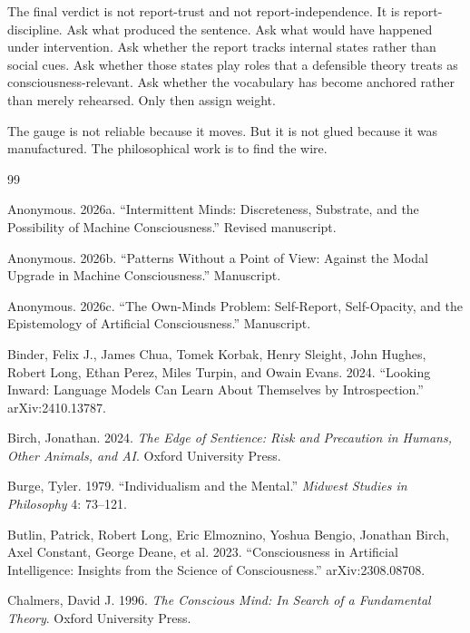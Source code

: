\documentclass[11pt]{article}
\begin{document}
The final verdict is not report-trust and not report-independence. It is report-discipline. Ask what produced the sentence. Ask what would have happened under intervention. Ask whether the report tracks internal states rather than social cues. Ask whether those states play roles that a defensible theory treats as consciousness-relevant. Ask whether the vocabulary has become anchored rather than merely rehearsed. Only then assign weight.

The gauge is not reliable because it moves. But it is not glued because it was manufactured. The philosophical work is to find the wire.

\newpage
\begin{thebibliography}{99}

Anonymous. 2026a. ``Intermittent Minds: Discreteness, Substrate, and the Possibility of Machine Consciousness.'' Revised manuscript.

Anonymous. 2026b. ``Patterns Without a Point of View: Against the Modal Upgrade in Machine Consciousness.'' Manuscript.

Anonymous. 2026c. ``The Own-Minds Problem: Self-Report, Self-Opacity, and the Epistemology of Artificial Consciousness.'' Manuscript.

Binder, Felix J., James Chua, Tomek Korbak, Henry Sleight, John Hughes, Robert Long, Ethan Perez, Miles Turpin, and Owain Evans. 2024. ``Looking Inward: Language Models Can Learn About Themselves by Introspection.'' arXiv:2410.13787.

Birch, Jonathan. 2024. \textit{The Edge of Sentience: Risk and Precaution in Humans, Other Animals, and AI}. Oxford University Press.

Burge, Tyler. 1979. ``Individualism and the Mental.'' \textit{Midwest Studies in Philosophy} 4: 73--121.

Butlin, Patrick, Robert Long, Eric Elmoznino, Yoshua Bengio, Jonathan Birch, Axel Constant, George Deane, et al. 2023. ``Consciousness in Artificial Intelligence: Insights from the Science of Consciousness.'' arXiv:2308.08708.

Chalmers, David J. 1996. \textit{The Conscious Mind: In Search of a Fundamental Theory}. Oxford University Press.


\end{thebibliography}
\end{document}
